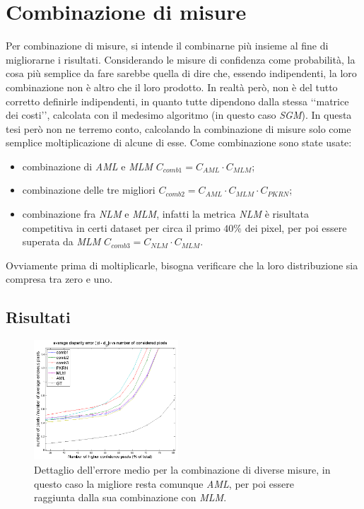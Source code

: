 \documentclass[12pt]{report}
\begin{document}
	\chapter{Combinazione di misure}
	\label{sec:combinazione}
	\pagestyle{fancy}
				
		Per combinazione di misure, si intende il combinarne più insieme al fine di migliorarne i risultati. Considerando le misure di confidenza come probabilità, la cosa più semplice da fare sarebbe quella di dire che, essendo indipendenti, la loro combinazione non è altro che il loro prodotto. In realtà però, non è del tutto corretto definirle indipendenti, in quanto tutte dipendono dalla stessa ‘‘matrice dei costi’’, calcolata con il medesimo algoritmo (in questo caso \textit{SGM}). In questa tesi però non ne terremo conto, calcolando la combinazione di misure solo come semplice moltiplicazione di alcune di esse. Come combinazione sono state usate:
		
		\begin{itemize}
			\item combinazione di \textit{AML} e \textit{MLM} $C_{comb1}=C_{AML}\cdot C_{MLM}$;
			
			\item combinazione delle tre migliori $C_{comb2}=C_{AML}\cdot C_{MLM}\cdot C_{PKRN}$;
			
			\item combinazione fra \textit{NLM} e \textit{MLM}, infatti la metrica \textit{NLM} è risultata competitiva in certi dataset per circa il primo $40\%$ dei pixel, per poi essere superata da \textit{MLM} $C_{comb3}=C_{NLM}\cdot C_{MLM}$. 
			\label{item:combinazioni}		
		\end{itemize}
		
		\noindent Ovviamente prima di moltiplicarle, bisogna verificare che la loro distribuzione sia compresa tra zero e uno.
		
		
		\section{Risultati}
		\label{sec:risultatiCombinazioni}

			\begin{figure}
				\centering
				\includegraphics[width=0.48\textwidth]{./figures/result6.png}
				\caption{Dettaglio dell'errore medio per la combinazione di diverse misure, in questo caso la migliore resta comunque \textit{AML}, per poi essere raggiunta dalla sua combinazione con \textit{MLM}.}
				\label{fig:combinazioni}
			\end{figure} 
\end{document}
